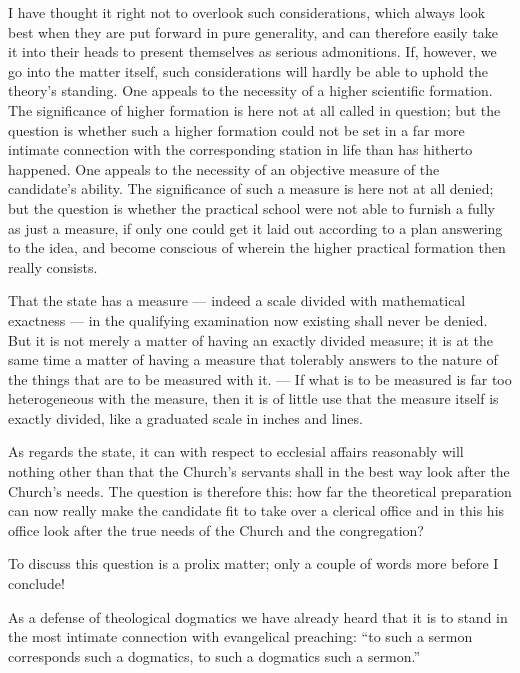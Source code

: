\documentclass[12pt,a4paper]{book}
\begin{document}
I have thought it right not to overlook such considerations, which always look best when they are
put forward in pure generality, and can therefore easily take it into their heads to present
themselves as serious admonitions. If, however, we go into the matter itself, such considerations
will hardly be able to uphold the theory's standing. One appeals to the necessity of a higher
scientific formation. The significance of higher formation is here not at all called in question;
but the question is whether such a higher formation could not be set in a far more intimate
connection with the corresponding station in life than has hitherto happened. One appeals to the
necessity of an objective measure of the candidate's ability. The significance of such a measure is
here not at all denied; but the question is whether the practical
school were not able to furnish a fully as just a measure, if only one could get it laid out
according to a plan answering to the idea, and become conscious of wherein the higher practical
formation then really consists.

That the state has a measure --- indeed a scale divided with mathematical exactness --- in the
qualifying examination now existing shall never be denied. But it is not merely a matter of having
an exactly divided measure; it is at the same time a matter of having a measure that tolerably
answers to the nature of the things that are to be measured with it. --- If what is to be measured
is far too heterogeneous with the measure, then it is of little use that the measure itself is
exactly divided, like a graduated scale in inches and lines.

As regards the state, it can with respect to ecclesial affairs reasonably will nothing other than
that the Church's servants shall in the best way look after the Church's needs. The question is
therefore this: how far the theoretical preparation can now really make the candidate fit to take
over a clerical office and in this his office look after the true needs of the Church and the
congregation?

To discuss this question is a prolix matter; only a couple of words more before I conclude!

As a defense of theological dogmatics we have already heard that it is
to stand in the most intimate connection with evangelical preaching: ``to such a sermon corresponds
such a dogmatics, to such a dogmatics such a sermon.''
\end{document}
